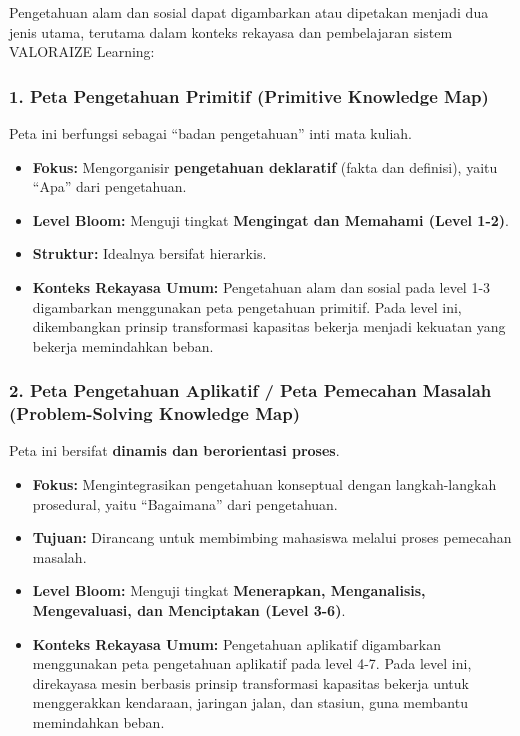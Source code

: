 \documentclass[
  letterpaper,
  DIV=11,
  numbers=noendperiod]{scrreprt}
\providecommand{\tightlist}{%
  \setlength{\itemsep}{0pt}\setlength{\parskip}{0pt}}
\begin{document}
Pengetahuan alam dan sosial dapat digambarkan atau dipetakan menjadi dua
jenis utama, terutama dalam konteks rekayasa dan pembelajaran sistem
VALORAIZE Learning:

\subsubsection{1. Peta Pengetahuan Primitif (Primitive Knowledge
Map)}\label{peta-pengetahuan-primitif-primitive-knowledge-map}

Peta ini berfungsi sebagai ``badan pengetahuan'' inti mata kuliah.

\begin{itemize}
\tightlist
\item
  \textbf{Fokus:} Mengorganisir \textbf{pengetahuan deklaratif} (fakta
  dan definisi), yaitu ``Apa'' dari pengetahuan.
\item
  \textbf{Level Bloom:} Menguji tingkat \textbf{Mengingat dan Memahami
  (Level 1-2)}.
\item
  \textbf{Struktur:} Idealnya bersifat hierarkis.
\item
  \textbf{Konteks Rekayasa Umum:} Pengetahuan alam dan sosial pada level
  1-3 digambarkan menggunakan peta pengetahuan primitif. Pada level ini,
  dikembangkan prinsip transformasi kapasitas bekerja menjadi kekuatan
  yang bekerja memindahkan beban.
\end{itemize}

\subsubsection{2. Peta Pengetahuan Aplikatif / Peta Pemecahan Masalah
(Problem-Solving Knowledge
Map)}\label{peta-pengetahuan-aplikatif-peta-pemecahan-masalah-problem-solving-knowledge-map}

Peta ini bersifat \textbf{dinamis dan berorientasi proses}.

\begin{itemize}
\tightlist
\item
  \textbf{Fokus:} Mengintegrasikan pengetahuan konseptual dengan
  langkah-langkah prosedural, yaitu ``Bagaimana'' dari pengetahuan.
\item
  \textbf{Tujuan:} Dirancang untuk membimbing mahasiswa melalui proses
  pemecahan masalah.
\item
  \textbf{Level Bloom:} Menguji tingkat \textbf{Menerapkan,
  Menganalisis, Mengevaluasi, dan Menciptakan (Level 3-6)}.
\item
  \textbf{Konteks Rekayasa Umum:} Pengetahuan aplikatif digambarkan
  menggunakan peta pengetahuan aplikatif pada level 4-7. Pada level ini,
  direkayasa mesin berbasis prinsip transformasi kapasitas bekerja untuk
  menggerakkan kendaraan, jaringan jalan, dan stasiun, guna membantu
  memindahkan beban.
\end{itemize}
\end{document}
